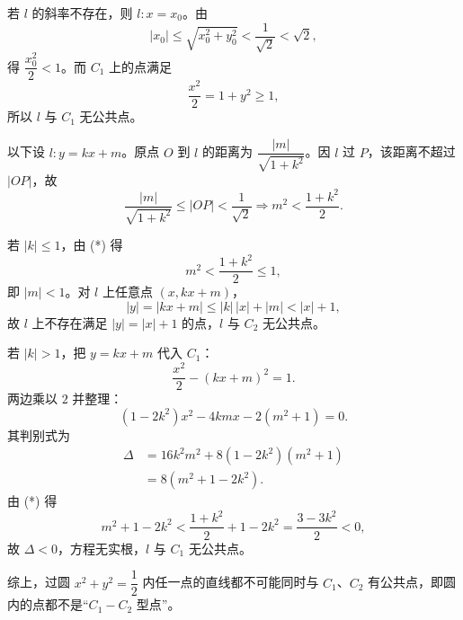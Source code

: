 \begin{answer}
若 $l$ 的斜率不存在，则 $l:x=x_0$。由
\nopagebreak[4]
\[|x_0|\leqslant\sqrt{x_0^2+y_0^2}<\frac1{\sqrt2}<\sqrt2,\]
得 $\dfrac{x_0^2}{2}<1$。而 $C_1$ 上的点满足
\nopagebreak[4]
\[\frac{x^2}{2}=1+y^2\geqslant1,\]
所以 $l$ 与 $C_1$ 无公共点。

以下设 $l:y=kx+m$。原点 $O$ 到 $l$ 的距离为 $\dfrac{|m|}{\sqrt{1+k^2}}$。因 $l$ 过 $P$，该距离不超过 $|OP|$，故
\nopagebreak[4]
\[\frac{|m|}{\sqrt{1+k^2}}\leqslant|OP|<\frac1{\sqrt2}
\Longrightarrow m^2<\frac{1+k^2}{2}. \tag{*}\]

若 $|k|\leqslant1$，由 (*) 得
\nopagebreak[4]
\[m^2<\frac{1+k^2}{2}\leqslant1,\]
即 $|m|<1$。对 $l$ 上任意点 $(x,kx+m)$，
\nopagebreak[4]
\[|y|=|kx+m|\leqslant|k|\,|x|+|m|<|x|+1,\]
故 $l$ 上不存在满足 $|y|=|x|+1$ 的点，$l$ 与 $C_2$ 无公共点。

若 $|k|>1$，把 $y=kx+m$ 代入 $C_1$：
\nopagebreak[4]
\[\frac{x^2}{2}-(kx+m)^2=1.\]
两边乘以 $2$ 并整理：
\nopagebreak[4]
\[\left(1-2k^2\right)x^2-4kmx-2\left(m^2+1\right)=0.\]
其判别式为
\nopagebreak[4]
\[\begin{aligned}
\Delta
&=16k^2m^2+8\left(1-2k^2\right)\left(m^2+1\right)\\
&=8\left(m^2+1-2k^2\right).
\end{aligned}\]
由 (*) 得
\nopagebreak[4]
\[m^2+1-2k^2<\frac{1+k^2}{2}+1-2k^2
=\frac{3-3k^2}{2}<0,\]
故 $\Delta<0$，方程无实根，$l$ 与 $C_1$ 无公共点。

综上，过圆 $x^2+y^2=\dfrac12$ 内任一点的直线都不可能同时与 $C_1$、$C_2$ 有公共点，即圆内的点都不是“$C_1-C_2$ 型点”。




\end{answer}
